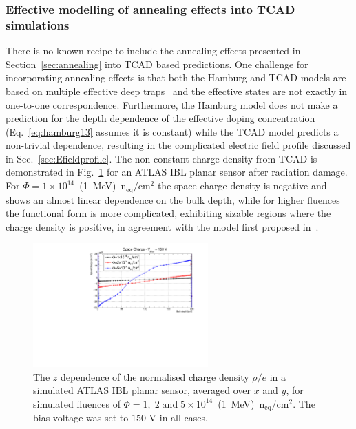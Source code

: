\subsubsection{Effective modelling of annealing effects into TCAD simulations}
\label{sec:TCADAnneal} 
There is no known recipe to include the annealing effects presented in Section~\ref{sec:annealing} into 
TCAD based predictions.  One challenge for incorporating annealing effects is that both the Hamburg and TCAD models are based on multiple effective deep 
traps~\cite{bib:DP,CHIOCHIA2006} and the effective states are not exactly in one-to-one correspondence.  Furthermore, the Hamburg model does not make a prediction for the depth dependence of the effective doping concentration (Eq.~\ref{eq:hamburg13} assumes it is constant) while the TCAD model predicts a non-trivial dependence, resulting in the complicated electric field profile discussed in Sec.~\ref{sec:Efieldprofile}.  The non-constant charge density from TCAD is demonstrated in Fig.~\ref{fig:TCADSpaceCharge} for an ATLAS IBL planar sensor after radiation damage.   For $\Phi=1\times10^{14}$~(1~MeV)~n$_\text{eq}/\text{cm}^{2}$ the space charge 
density is negative and shows an almost linear dependence on the bulk depth, 
while for higher fluences the 
functional form is more complicated, exhibiting sizable regions where the charge density is positive, 
in agreement with the model first proposed in~\cite{bib:DP}.

\begin{figure}[!htpb]
\centering
\includegraphics[width=0.6\textwidth]{TCAD_SpaceCharge_150V.pdf}
\caption{\label{fig:TCADSpaceCharge}The $z$ dependence of the normalised 
charge density $\rho/e$ in a simulated 
 ATLAS IBL planar sensor, averaged over $x$ and $y$, for  simulated
  fluences of $\Phi=1,\;2\; \text{and}\; 5\times10^{14}$~(1~MeV)~n$_\text{eq}/\text{cm}^{2}$. The bias voltage was set to $150$ V in all cases.}
\end{figure}


